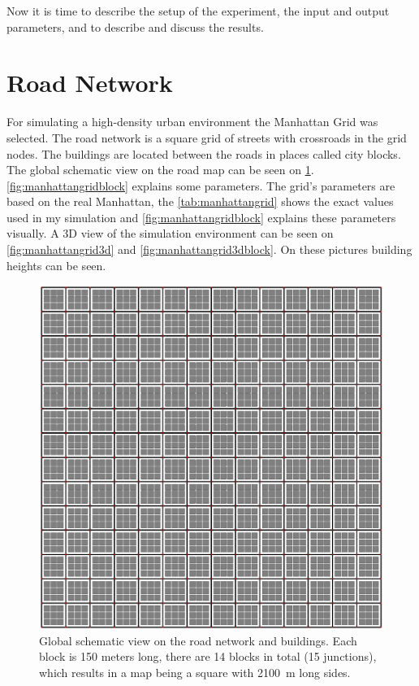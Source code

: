 \documentclass[]{nsm-thesis}
\begin{document}
Now it is time to describe the setup of the experiment, the input and output parameters, and to describe and discuss the results.



\section{Road Network}

For simulating a high-density urban environment the Manhattan Grid was selected. The road network is a square grid of streets with crossroads in the grid nodes. The buildings are located between the roads in places called city blocks. The global schematic view on the road map can be seen on \cref{fig:manhattangrid}. \cref{fig:manhattangridblock} explains some parameters. The grid's parameters are based on the real Manhattan, the \cref{tab:manhattangrid} shows the exact values used in my simulation and \cref{fig:manhattangridblock} explains these parameters visually. A 3D view of the simulation environment can be seen on \cref{fig:manhattangrid3d} and \cref{fig:manhattangrid3dblock}. On these pictures building heights can be seen.

\begin{figure}
	\centering
	\includegraphics[width=1\textwidth]{figures/ManhattanGrid.png}
	\caption{Global schematic view on the road network and buildings. Each block is 150 meters long, there are 14 blocks in total (15 junctions), which results in a map being a square with \SI{2100}{\meter} long sides.}
	\label{fig:manhattangrid}
\end{figure}
\end{document}
